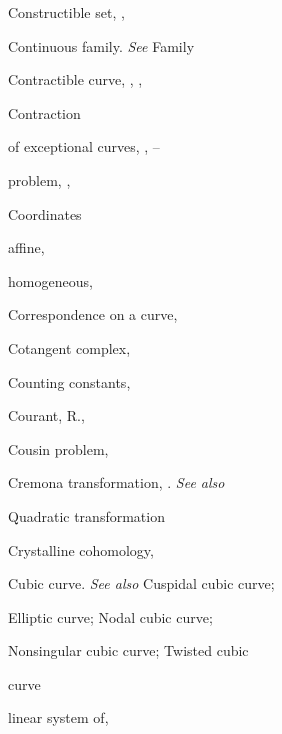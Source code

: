 {{\noindent\hspace*{0.0bp}Constructible set, , \par
\noindent\hspace*{0.0bp}Continuous family. \emph{See} Family\par
\noindent\hspace*{0.0bp}Contractible curve, , , \par
\noindent\hspace*{0.0bp}Contraction\par
\noindent\hspace*{7.5bp}of exceptional curves, , --\par
\noindent\hspace*{7.5bp}problem, , \par
\noindent\hspace*{0.0bp}Coordinates\par
\noindent\hspace*{7.5bp}affine, \par
\noindent\hspace*{7.5bp}homogeneous, \par
\noindent\hspace*{0.0bp}Correspondence on a curve, \par
\noindent\hspace*{0.0bp}Cotangent complex, \par
\noindent\hspace*{0.0bp}Counting constants, \par
\noindent\hspace*{0.0bp}Courant, R., \par
\noindent\hspace*{0.0bp}Cousin problem, \par
\noindent\hspace*{0.0bp}Cremona transformation, . \emph{See also}\par
\noindent\hspace*{15.0bp}Quadratic transformation\par
\noindent\hspace*{0.0bp}Crystalline cohomology, \par
\noindent\hspace*{0.0bp}Cubic curve. \emph{See also} Cuspidal cubic curve;\par
\noindent\hspace*{15.0bp}Elliptic curve; Nodal cubic curve;\par
\noindent\hspace*{15.0bp}Nonsingular cubic curve; Twisted cubic\par
\noindent\hspace*{15.0bp}curve\par
\noindent\hspace*{7.5bp}linear system of, \par
}
}
